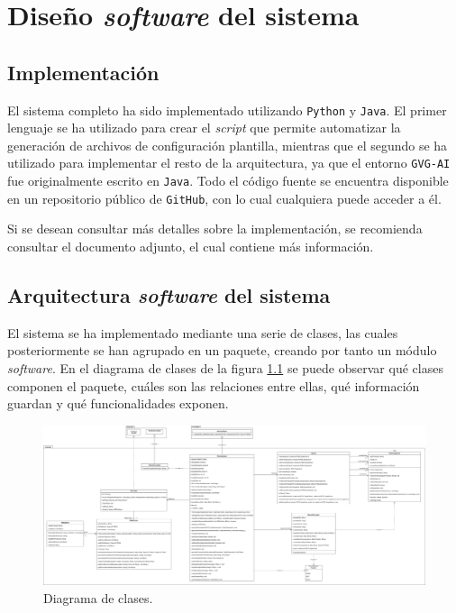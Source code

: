 
\chapter{Diseño \textit{software} del sistema}

\section{Implementación}

El sistema completo ha sido implementado utilizando \texttt{Python} y \texttt{Java}.
El primer lenguaje se ha utilizado para crear el \textit{script} que permite
automatizar la generación de archivos de configuración plantilla, mientras que el segundo
se ha utilizado para implementar el resto de la arquitectura, ya que el entorno
\texttt{GVG-AI} fue originalmente escrito en \texttt{Java}. Todo el código fuente
se encuentra disponible en un repositorio público de \texttt{GitHub}, con lo cual
cualquiera puede acceder a él.

Si se desean consultar más detalles sobre la implementación, se recomienda consultar
el documento adjunto, el cual contiene más información.

\section{Arquitectura \textit{software} del sistema}

El sistema se ha implementado mediante una serie de clases, las cuales posteriormente
se han agrupado en un paquete, creando por tanto un módulo \textit{software}. En el diagrama
de clases de la figura \ref{fig:class_diagram} se puede observar qué clases componen
el paquete, cuáles son las relaciones entre ellas, qué información guardan y
qué funcionalidades exponen.

\begin{figure}[H]
    \centering
    \includegraphics[angle=90, origin=c, scale=0.18]{img/CH07/class_diagram.png}
    \caption{Diagrama de clases.}
    \label{fig:class_diagram}
\end{figure}

